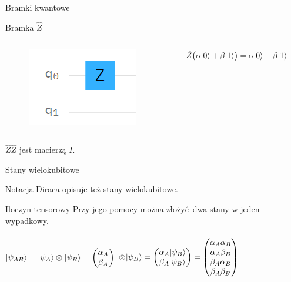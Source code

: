 \documentclass{beamer}
\DeclarePairedDelimiter\ket{\lvert}{\rangle}
\newcommand{\tens}[1]{%
	\mathbin{\mathop{\otimes}\displaylimits_{#1}}%
}
\begin{document}
\begin{frame}{Bramki kwantowe}
\begin{block}{Bramka $\hat{Z}$}
\begin{columns}
				\begin{column}{0.3\textwidth}
					\begin{center}
						\begin{figure}
							\includegraphics[scale=0.5]{media/bramkaZ.png}
						\end{figure}
					\end{center}
				\end{column}
				
				\begin{column}{0.5\textwidth}
					\begin{flushleft}
						$\hat{Z}\big(\alpha\ket{0}+\beta\ket{1}\big)=\alpha\ket{0}-\beta\ket{1}$
					\end{flushleft}	
				\end{column}
			\end{columns}
			\vspace{0.5em}
			$\hat{Z}\hat{Z}$ jest macierzą $I$.
			\vspace{0.5em}
		\end{block}
	\end{frame}

	\begin{frame}{Stany wielokubitowe}
	
	\begin{block}{}
		\vspace{0.5em}
			Notacja Diraca opisuje też stany wielokubitowe.	
		\vspace{0.5em}
	\end{block}
		\begin{block}{Iloczyn tensorowy}
			\vspace{0.5em}
			Przy jego pomocy można złożyć dwa stany w jeden wypadkowy.\\~\\
			$\ket{\psi_{AB}} = \ket{\psi_{A}}\tens{}\ket{\psi_{B}}=
			\begin{pmatrix}
			\alpha_{A}\\
			\beta_{A}
			\end{pmatrix}$
			$\tens{}\ket{\psi_{B}}=
			\begin{pmatrix}
			\alpha_{A}\ket{\psi_{B}}\\
			\beta_{A}\ket{\psi_{B}}
			\end{pmatrix}
			=
			\begin{pmatrix}
			\alpha_{A}\alpha_{B}\\
			\alpha_{A}\beta_{B}\\
			\beta_{A}\alpha_{B}\\
			\beta_{A}\beta_{B}\\									
			\end{pmatrix}
			$			
			\vspace{0.5em}
		\end{block}
	\end{frame}
		
\end{document}
